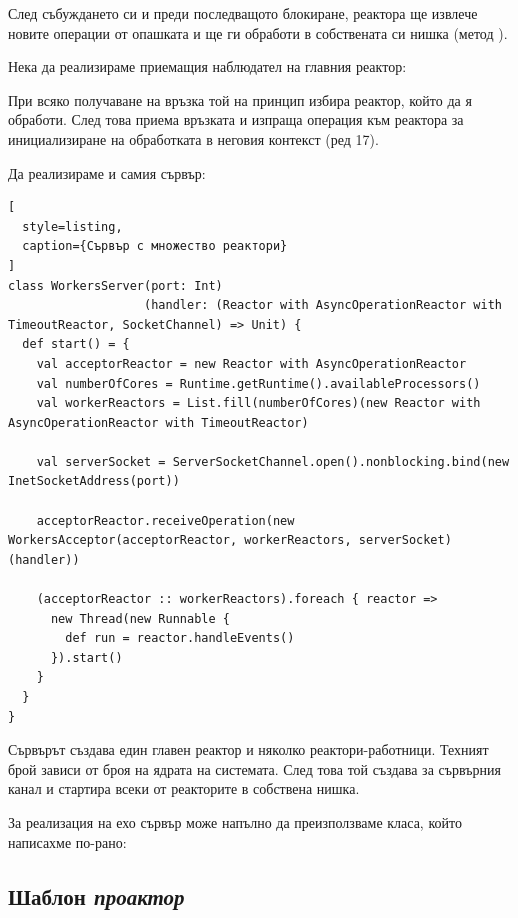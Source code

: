 След събуждането си и преди последващото блокиране, реактора ще извлече новите операции от опашката и ще ги обработи в собствената си нишка (метод ).

Нека да реализираме приемащия наблюдател на главния реактор:



При всяко получаване на връзка той на  принцип избира реактор, който да я обработи. След това приема връзката и изпраща операция към реактора за инициализиране на обработката в неговия контекст (ред 17).

Да реализираме и самия сървър:

\begin{lstlisting}[
  style=listing,
  caption={Сървър с множество реактори}
]
class WorkersServer(port: Int)
                   (handler: (Reactor with AsyncOperationReactor with TimeoutReactor, SocketChannel) => Unit) {
  def start() = {
    val acceptorReactor = new Reactor with AsyncOperationReactor
    val numberOfCores = Runtime.getRuntime().availableProcessors()
    val workerReactors = List.fill(numberOfCores)(new Reactor with AsyncOperationReactor with TimeoutReactor)

    val serverSocket = ServerSocketChannel.open().nonblocking.bind(new InetSocketAddress(port))

    acceptorReactor.receiveOperation(new WorkersAcceptor(acceptorReactor, workerReactors, serverSocket)(handler))

    (acceptorReactor :: workerReactors).foreach { reactor =>
      new Thread(new Runnable {
        def run = reactor.handleEvents()
      }).start()
    }
  }
}
\end{lstlisting}

Сървърът създава един главен реактор и няколко реактори-работници. Техният брой зависи от броя на ядрата на системата. След това той създава  за сървърния канал и стартира всеки от реакторите в собствена нишка.

За реализация на ехо сървър може напълно да преизползваме  класа, който написахме по-рано:



\subsection{Шаблон \emph{проактор}}
\label{sec:proactor}

